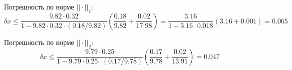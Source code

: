 Погрешность по норме $||\cdot||_1$:
\begin{equation*}
    \delta{x} \leq
    \frac{9.82\cdot{0.32}}{1-9.82\cdot{0.32}\cdot{(0.18/9.82)}}
    \left(\frac{0.18}{9.82} + \frac{0.02}{17.98}\right)
    =
    \frac{3.16}{1 - 3.16\cdot{0.018}} \left(3.16 + 0.001\right)
    =
    0.065
\end{equation*}

Погрешность по норме $||\cdot||_2$:
\begin{equation*}
    \delta{x} \leq
    \frac{9.79\cdot{0.25}}{1-9.79\cdot{0.25}\cdot{(0.17/9.78)}}
    \left(\frac{0.17}{9.78} + \frac{0.02}{13.91}\right)
    =
    0.047
\end{equation*}
